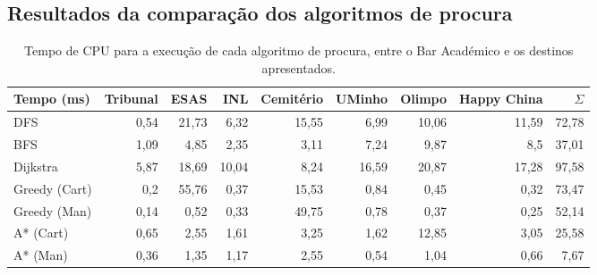 \documentclass[12pt, a4paper, titlepage]{article}
\begin{document}


\subsection{Resultados da comparação dos algoritmos de procura}
\label{comparison-data}

\begin{table}[H]
    \small

    \begin{adjustwidth}{-1.5cm}{-1.5cm}
        \begin{center}
            \begin{tabular}{|l|r|r|r|r|r|r|r|r|}
                \hline
                    Tempo (ms)  &
                    Tribunal    &
                    ESAS        &
                    INL         &
                    Cemitério   &
                    UMinho      &
                    Olimpo      &
                    Happy China &
                    $\Sigma$    \\

                \hline
                DFS & 0,54 & 21,73 & 6,32 & 15,55 & 6,99 & 10,06 & 11,59 & 72,78 \\
                \hline
                BFS & 1,09 & 4,85 & 2,35 & 3,11 & 7,24 & 9,87 & 8,5 & 37,01 \\
                \hline
                Dijkstra & 5,87 & 18,69 & 10,04 & 8,24 & 16,59 & 20,87 & 17,28 & 97,58 \\
                \hline
                Greedy (Cart) & 0,2 & 55,76 & 0,37 & 15,53 & 0,84 & 0,45 & 0,32 & 73,47 \\
                \hline
                Greedy (Man) & 0,14 & 0,52 & 0,33 & 49,75 & 0,78 & 0,37 & 0,25 & 52,14 \\
                \hline
                A* (Cart) & 0,65 & 2,55 & 1,61 & 3,25 & 1,62 & 12,85 & 3,05 & 25,58 \\
                \hline
                A* (Man) & 0,36 & 1,35 & 1,17 & 2,55 & 0,54 & 1,04 & 0,66 & 7,67 \\
                \hline
            \end{tabular}
        \end{center}
    \end{adjustwidth}

    \caption{
        Tempo de CPU para a execução de cada algoritmo de procura, entre o Bar Académico e os
        destinos apresentados.
    }
\end{table}
\end{document}
